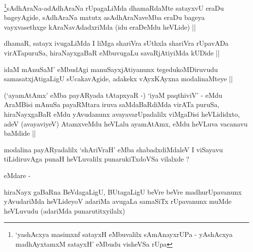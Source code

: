 
\begin{artha}
\footnote[1]{`yashAcxya masimxnf satayxH eMbuvalilx sAmAnayxrUPa -
  yAshAcxya madhAyxtamxM satayxH' eMbudu visheVSa rUpa}sAdhAraNa-adAdhAraNa rUpagaLiMda dhamaRdaMte satayxvU
eraDu bageyAgide, sAdhAraNa matutx asAdhAraNaveMba eraDu bageya
vayxvasethxge kAraNavAdadxriMda (idu eraDeMdu heVLide) ||
\end{artha}


\begin{artha}
dhamaR, satayx ivugaLiMda I liMga shariVra
sUthxla shariVra rUpavADa virATapuruSa, hiraNayxgaBaR eMbuvugaLu
savaRjAtiyiMda kUDide ||
\end{artha}

\begin{artha}
idaM mAnuSaM' eMbudAgi manuSayxjAtiyanunx tegedukoMDiruvudu
samasatxjAtigaLigU sUcakavAgide, adakekx vAyxKAyxna modalinaMteye ||
\end{artha}

\begin{artha}
(`ayamAtAmx' eMba payARyada tAtapxyaR -) `iyaM paqthiviV' - eMdu
  AraMBisi mAnuSa payaRMtara iruva saMdaBaRdiMda virATa puruSa,
  hiraNayxgaBaR eMdu yAvudanunx avayavarUpadalilx viMgaDisi
  heVLididxto, adeV (avayaviyeV) AtamxveMdu heVLalu ayamAtAmx, eMdu
  heVLuva vacanavu baMdide ||
\end{artha}

\begin{artha}
modalina payARyadalilx `shAriVraH' eMba shabadxdiMdaleV I viSayavu
tiLidiruvAga punaH heVLuvalilx punarukiTxdoVSa vilalxde ? 

eMdare -
\end{artha}

\begin{artha}
hiraNayx gaBaRna BeVdagaLigU, BUtagaLigU beVre beVre madhurUpavanunx
yAvudariMda heVLideyoV adariMa avugaLa samaSiTx rUpavanunx muMde
heVLuvudu (adariMda punarutitxyilalx) 
\end{artha}

